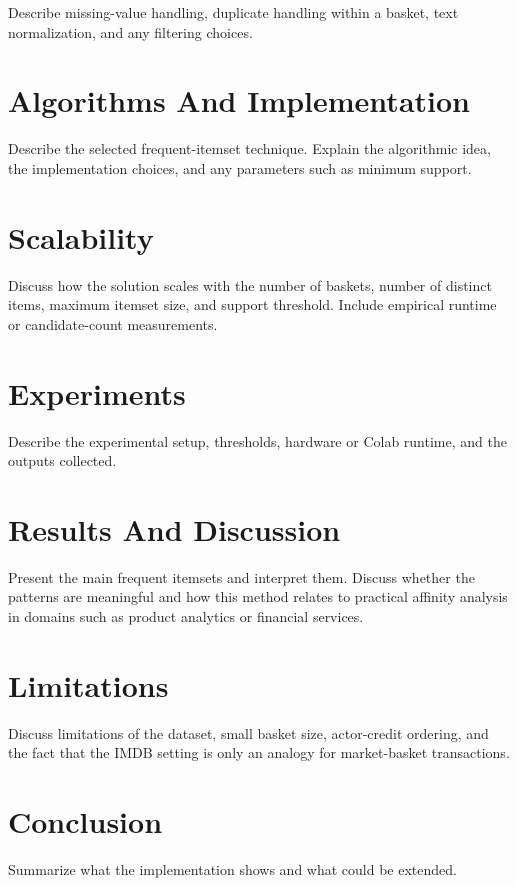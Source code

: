 \documentclass[11pt,a4paper]{article}
\begin{document}
Describe missing-value handling, duplicate handling within a basket, text
normalization, and any filtering choices.

\section{Algorithms And Implementation}

Describe the selected frequent-itemset technique. Explain the algorithmic idea,
the implementation choices, and any parameters such as minimum support.

\section{Scalability}

Discuss how the solution scales with the number of baskets, number of distinct
items, maximum itemset size, and support threshold. Include empirical runtime
or candidate-count measurements.

\section{Experiments}

Describe the experimental setup, thresholds, hardware or Colab runtime, and the
outputs collected.

\section{Results And Discussion}

Present the main frequent itemsets and interpret them. Discuss whether the
patterns are meaningful and how this method relates to practical affinity
analysis in domains such as product analytics or financial services.

\section{Limitations}

Discuss limitations of the dataset, small basket size, actor-credit ordering,
and the fact that the IMDB setting is only an analogy for market-basket
transactions.

\section{Conclusion}

Summarize what the implementation shows and what could be extended.



\end{document}
